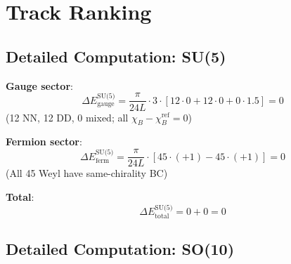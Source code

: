 \documentclass[11pt,a4paper]{article}
\begin{document}
\section{Track Ranking}

\subsection{Detailed Computation: SU(5)}

\begin{computebox}
\textbf{Gauge sector}:
\begin{equation}
\label{eq:comp-su5-gauge}
\Delta E_{\text{gauge}}^{\text{SU(5)}} = \frac{\pi}{24L} \cdot 3 \cdot [12 \cdot 0 + 12 \cdot 0 + 0 \cdot 1.5] = 0
\end{equation}
(12 NN, 12 DD, 0 mixed; all $\chi_B - \chi_B^{\text{ref}} = 0$)

\textbf{Fermion sector}:
\begin{equation}
\label{eq:comp-su5-ferm}
\Delta E_{\text{ferm}}^{\text{SU(5)}} = \frac{\pi}{24L} \cdot [45 \cdot (+1) - 45 \cdot (+1)] = 0
\end{equation}
(All 45 Weyl have same-chirality BC)

\textbf{Total}:
\begin{equation}
\label{eq:comp-su5-total}
\Delta E_{\text{total}}^{\text{SU(5)}} = 0 + 0 = 0
\end{equation}
\end{computebox}

\subsection{Detailed Computation: SO(10)}
\end{document}
